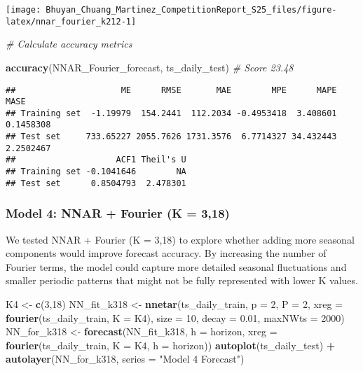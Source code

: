 \documentclass[
]{article}
\newenvironment{Shaded}{\begin{snugshade}}{\end{snugshade}}
\newcommand{\AttributeTok}[1]{\textcolor[rgb]{0.13,0.29,0.53}{#1}}
\newcommand{\CommentTok}[1]{\textcolor[rgb]{0.56,0.35,0.01}{\textit{#1}}}
\newcommand{\DecValTok}[1]{\textcolor[rgb]{0.00,0.00,0.81}{#1}}
\newcommand{\FloatTok}[1]{\textcolor[rgb]{0.00,0.00,0.81}{#1}}
\newcommand{\FunctionTok}[1]{\textcolor[rgb]{0.13,0.29,0.53}{\textbf{#1}}}
\newcommand{\NormalTok}[1]{#1}
\newcommand{\OtherTok}[1]{\textcolor[rgb]{0.56,0.35,0.01}{#1}}
\newcommand{\SpecialCharTok}[1]{\textcolor[rgb]{0.81,0.36,0.00}{\textbf{#1}}}
\newcommand{\StringTok}[1]{\textcolor[rgb]{0.31,0.60,0.02}{#1}}
\begin{document}
\begin{center}\texttt{[image: Bhuyan\_Chuang\_Martinez\_CompetitionReport\_S25\_files/figure-latex/nnar\_fourier\_k212-1]} \end{center}

\begin{Shaded}
\begin{Highlighting}[]
\CommentTok{\# Calculate accuracy metrics}

\FunctionTok{accuracy}\NormalTok{(NNAR\_Fourier\_forecast, ts\_daily\_test) }\CommentTok{\# Score 23.48}
\end{Highlighting}
\end{Shaded}

\begin{verbatim}
##                     ME      RMSE       MAE        MPE      MAPE      MASE
## Training set  -1.19979  154.2441  112.2034 -0.4953418  3.408601 0.1458308
## Test set     733.65227 2055.7626 1731.3576  6.7714327 34.432443 2.2502467
##                    ACF1 Theil's U
## Training set -0.1041646        NA
## Test set      0.8504793  2.478301
\end{verbatim}

\subsubsection{Model 4: NNAR + Fourier (K =
3,18)}\label{model-4-nnar-fourier-k-318}

We tested NNAR + Fourier (K = 3,18) to explore whether adding more
seasonal components would improve forecast accuracy. By increasing the
number of Fourier terms, the model could capture more detailed seasonal
fluctuations and smaller periodic patterns that might not be fully
represented with lower K values.

\begin{Shaded}
\begin{Highlighting}[]
\NormalTok{K4 }\OtherTok{\textless{}{-}} \FunctionTok{c}\NormalTok{(}\DecValTok{3}\NormalTok{,}\DecValTok{18}\NormalTok{)}
\NormalTok{NN\_fit\_k318 }\OtherTok{\textless{}{-}} \FunctionTok{nnetar}\NormalTok{(ts\_daily\_train, }\AttributeTok{p =} \DecValTok{2}\NormalTok{, }\AttributeTok{P =} \DecValTok{2}\NormalTok{, }\AttributeTok{xreg =} \FunctionTok{fourier}\NormalTok{(ts\_daily\_train, }\AttributeTok{K =}\NormalTok{ K4), }\AttributeTok{size =} \DecValTok{10}\NormalTok{, }\AttributeTok{decay =} \FloatTok{0.01}\NormalTok{, }\AttributeTok{maxNWts =} \DecValTok{2000}\NormalTok{)}
\NormalTok{NN\_for\_k318 }\OtherTok{\textless{}{-}} \FunctionTok{forecast}\NormalTok{(NN\_fit\_k318, }\AttributeTok{h =}\NormalTok{ horizon, }\AttributeTok{xreg =} \FunctionTok{fourier}\NormalTok{(ts\_daily\_train, }\AttributeTok{K =}\NormalTok{ K4, }\AttributeTok{h =}\NormalTok{ horizon))}
\FunctionTok{autoplot}\NormalTok{(ts\_daily\_test) }\SpecialCharTok{+} \FunctionTok{autolayer}\NormalTok{(NN\_for\_k318, }\AttributeTok{series =} \StringTok{"Model 4 Forecast"}\NormalTok{)}
\end{Highlighting}
\end{Shaded}
\end{document}

